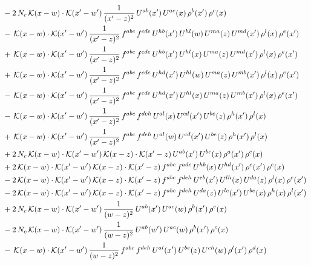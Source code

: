 \documentclass[9pt]{article}
\numberwithin{equation}{section}
\begin{document}
\begin{align}
&-2\,N_{c}\,\mathcal{K}(x-w)\cdot\mathcal{K}(x'-w')\,\frac{1}{(x'-z)^{2}}\,U^{ab}(x')\,U^{ac}(x)\,\rho^{b}(x')\,\rho^{c}(x)\notag\\
&-\,\mathcal{K}(x-w)\cdot\mathcal{K}(x'-w')\,\frac{1}{(x'-z)^{2}}\,f^{abc}\,f^{cde}\,U^{hb}(x')\,U^{hl}(w)\,U^{ma}(z)\,U^{md}(x')\,\rho^{l}(x)\,\rho^{e}(x')\notag\\
&+\,\mathcal{K}(x-w)\cdot\mathcal{K}(x'-w')\,\frac{1}{(x'-z)^{2}}\,f^{abc}\,f^{cde}\,U^{hb}(x')\,U^{hl}(x)\,U^{ma}(z)\,U^{md}(x')\,\rho^{l}(x)\,\rho^{e}(x')\notag\\
&+\,\mathcal{K}(x-w)\cdot\mathcal{K}(x'-w')\,\frac{1}{(x'-z)^{2}}\,f^{abc}\,f^{cde}\,U^{hd}(x')\,U^{hl}(w)\,U^{ma}(z)\,U^{mb}(x')\,\rho^{l}(x)\,\rho^{e}(x')\notag\\
&-\,\mathcal{K}(x-w)\cdot\mathcal{K}(x'-w')\,\frac{1}{(x'-z)^{2}}\,f^{abc}\,f^{cde}\,U^{hd}(x')\,U^{hl}(x)\,U^{ma}(z)\,U^{mb}(x')\,\rho^{l}(x)\,\rho^{e}(x')\notag\\
&-\,\mathcal{K}(x-w)\cdot\mathcal{K}(x'-w')\,\frac{1}{(x'-z)^{2}}\,f^{abc}\,f^{deh}\,U^{al}(x)\,U^{cd}(x')\,U^{be}(z)\,\rho^{h}(x')\,\rho^{l}(x)\notag\\
&+\,\mathcal{K}(x-w)\cdot\mathcal{K}(x'-w')\,\frac{1}{(x'-z)^{2}}\,f^{abc}\,f^{deh}\,U^{al}(w)\,U^{cd}(x')\,U^{be}(z)\,\rho^{h}(x')\,\rho^{l}(x)\notag\\
&+2\,N_{c}\,\mathcal{K}(x-w)\cdot\mathcal{K}(x'-w')\,\mathcal{K}(x-z)\cdot\mathcal{K}(x'-z)\,U^{ab}(x')\,U^{bc}(x)\,\rho^{a}(x')\,\rho^{c}(x)\notag\\
&+2\,\mathcal{K}(x-w)\cdot\mathcal{K}(x'-w')\,\mathcal{K}(x-z)\cdot\mathcal{K}(x'-z)\,f^{abc}\,f^{ade}\,U^{hb}(x)\,U^{hd}(x')\,\rho^{e}(x')\,\rho^{c}(x)\notag\\
&-2\,\mathcal{K}(x-w)\cdot\mathcal{K}(x'-w')\,\mathcal{K}(x-z)\cdot\mathcal{K}(x'-z)\,f^{abc}\,f^{deh}\,U^{eb}(x')\,U^{lh}(x)\,U^{da}(z)\,\rho^{l}(x)\,\rho^{c}(x')\notag\\
&-2\,\mathcal{K}(x-w)\cdot\mathcal{K}(x'-w')\,\mathcal{K}(x-z)\cdot\mathcal{K}(x'-z)\,f^{abc}\,f^{deh}\,U^{da}(z)\,U^{lc}(x')\,U^{be}(x)\,\rho^{h}(x)\,\rho^{l}(x')\notag\\
&+2\,N_{c}\,\mathcal{K}(x-w)\cdot\mathcal{K}(x'-w')\,\frac{1}{(w-z)^{2}}\,U^{ab}(x')\,U^{ac}(w)\,\rho^{b}(x')\,\rho^{c}(x)\notag\\
&-2\,N_{c}\,\mathcal{K}(x-w)\cdot\mathcal{K}(x'-w')\,\frac{1}{(w-z)^{2}}\,U^{ab}(w')\,U^{ac}(w)\,\rho^{b}(x')\,\rho^{c}(x)\notag\\
&-\,\mathcal{K}(x-w)\cdot\mathcal{K}(x'-w')\,\frac{1}{(w-z)^{2}}\,f^{abc}\,f^{deh}\,U^{al}(x')\,U^{be}(z)\,U^{ch}(w)\,\rho^{l}(x')\,\rho^{d}(x)\notag\\

\end{align}
\end{document}
